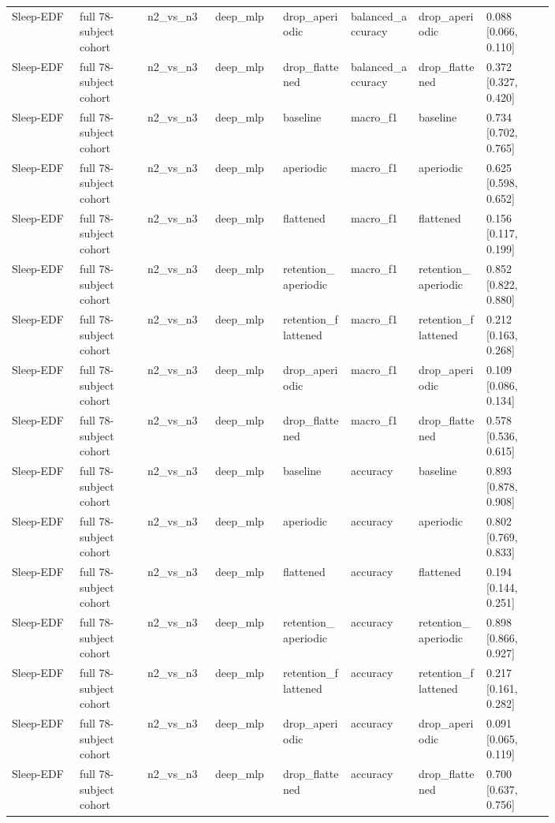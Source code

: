 \begin{longtable}{p{0.10\linewidth}p{0.10\linewidth}p{0.10\linewidth}p{0.10\linewidth}p{0.10\linewidth}p{0.10\linewidth}p{0.10\linewidth}p{0.10\linewidth}}
Sleep-EDF & full 78-subject cohort & n2\_vs\_n3 & deep\_mlp & drop\_aperiodic & balanced\_accuracy & drop\_aperiodic & 0.088 [0.066, 0.110]\\
Sleep-EDF & full 78-subject cohort & n2\_vs\_n3 & deep\_mlp & drop\_flattened & balanced\_accuracy & drop\_flattened & 0.372 [0.327, 0.420]\\
Sleep-EDF & full 78-subject cohort & n2\_vs\_n3 & deep\_mlp & baseline & macro\_f1 & baseline & 0.734 [0.702, 0.765]\\
Sleep-EDF & full 78-subject cohort & n2\_vs\_n3 & deep\_mlp & aperiodic & macro\_f1 & aperiodic & 0.625 [0.598, 0.652]\\
Sleep-EDF & full 78-subject cohort & n2\_vs\_n3 & deep\_mlp & flattened & macro\_f1 & flattened & 0.156 [0.117, 0.199]\\
Sleep-EDF & full 78-subject cohort & n2\_vs\_n3 & deep\_mlp & retention\_aperiodic & macro\_f1 & retention\_aperiodic & 0.852 [0.822, 0.880]\\
Sleep-EDF & full 78-subject cohort & n2\_vs\_n3 & deep\_mlp & retention\_flattened & macro\_f1 & retention\_flattened & 0.212 [0.163, 0.268]\\
Sleep-EDF & full 78-subject cohort & n2\_vs\_n3 & deep\_mlp & drop\_aperiodic & macro\_f1 & drop\_aperiodic & 0.109 [0.086, 0.134]\\
Sleep-EDF & full 78-subject cohort & n2\_vs\_n3 & deep\_mlp & drop\_flattened & macro\_f1 & drop\_flattened & 0.578 [0.536, 0.615]\\
Sleep-EDF & full 78-subject cohort & n2\_vs\_n3 & deep\_mlp & baseline & accuracy & baseline & 0.893 [0.878, 0.908]\\
Sleep-EDF & full 78-subject cohort & n2\_vs\_n3 & deep\_mlp & aperiodic & accuracy & aperiodic & 0.802 [0.769, 0.833]\\
Sleep-EDF & full 78-subject cohort & n2\_vs\_n3 & deep\_mlp & flattened & accuracy & flattened & 0.194 [0.144, 0.251]\\
Sleep-EDF & full 78-subject cohort & n2\_vs\_n3 & deep\_mlp & retention\_aperiodic & accuracy & retention\_aperiodic & 0.898 [0.866, 0.927]\\
Sleep-EDF & full 78-subject cohort & n2\_vs\_n3 & deep\_mlp & retention\_flattened & accuracy & retention\_flattened & 0.217 [0.161, 0.282]\\
Sleep-EDF & full 78-subject cohort & n2\_vs\_n3 & deep\_mlp & drop\_aperiodic & accuracy & drop\_aperiodic & 0.091 [0.065, 0.119]\\
Sleep-EDF & full 78-subject cohort & n2\_vs\_n3 & deep\_mlp & drop\_flattened & accuracy & drop\_flattened & 0.700 [0.637, 0.756]\\

\end{longtable}
